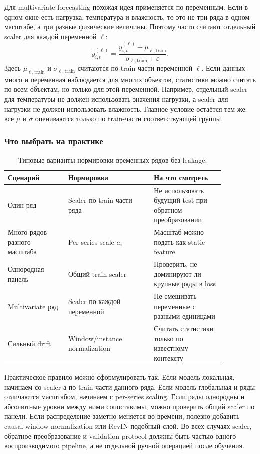 \documentclass[12pt,fleqn]{article}
\begin{document}
Для multivariate forecasting похожая идея применяется по переменным.
Если в одном окне есть нагрузка, температура и влажность, то это не три ряда в одном масштабе, а три разные физические величины.
Поэтому часто считают отдельный scaler для каждой переменной $\ell$:
\begin{equation}
  \widetilde{y}_{i,t}^{(\ell)}
  =
  \frac{y_{i,t}^{(\ell)}-\mu_{\ell,\mathrm{train}}}{\sigma_{\ell,\mathrm{train}}+\varepsilon}.
\end{equation}
Здесь $\mu_{\ell,\mathrm{train}}$ и $\sigma_{\ell,\mathrm{train}}$ считаются по train-части переменной $\ell$.
Если данных много и переменная наблюдается для многих объектов, статистики можно считать по всем объектам, но только для этой переменной.
Например, отдельный scaler для температуры не должен использовать значения нагрузки, а scaler для нагрузки не должен использовать влажность.
Главное условие остаётся тем же: все $\mu$ и $\sigma$ оцениваются только по train-части соответствующей группы.

\subsubsection{Что выбрать на практике}

\begin{table}[!ht]
\centering
\begin{tabular}{p{0.24\linewidth}p{0.34\linewidth}p{0.28\linewidth}}
\hline
Сценарий & Нормировка & На что смотреть \\
\hline
Один ряд & Scaler по train-части ряда & Не использовать будущий test при обратном преобразовании \\
Много рядов разного масштаба & Per-series scale $a_i$ & Масштаб можно подать как static feature \\
Однородная панель & Общий train-scaler & Проверить, не доминируют ли крупные ряды в loss \\
Multivariate ряд & Scaler по каждой переменной & Не смешивать переменные с разными единицами \\
Сильный drift & Window/instance normalization & Считать статистики только по известному контексту \\
\hline
\end{tabular}
\caption{Типовые варианты нормировки временных рядов без leakage.}
\end{table}

Практическое правило можно сформулировать так.
Если модель локальная, начинаем со scaler-а по train-части данного ряда.
Если модель глобальная и ряды отличаются масштабом, начинаем с per-series scaling.
Если ряды однородны и абсолютные уровни между ними сопоставимы, можно проверить общий scaler по панели.
Если распределение заметно меняется во времени, полезно добавить causal window normalization или RevIN-подобный слой.
Во всех случаях scaler, обратное преобразование и validation protocol должны быть частью одного воспроизводимого pipeline, а не отдельной ручной операцией после обучения.
\end{document}
